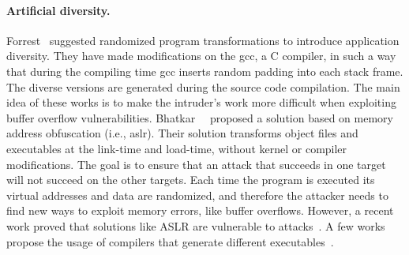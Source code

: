 \paragraph{Artificial diversity.} 
Forrest~\cite{Forrest:1997} suggested randomized program transformations to introduce application diversity. 
They have made modifications on the gcc, a C compiler, in such a way that during the compiling time gcc inserts random padding
into each stack frame. 
The diverse versions are generated during the source code compilation. 
The main idea of these works is to make the intruder’s work more difficult when exploiting buffer overflow vulnerabilities.
Bhatkar~\etal{}~\cite{Bhatkar:2003} proposed a solution based on memory address obfuscation (i.e., \gls{aslr}). 
Their solution transforms object files and executables at the link-time and load-time, without kernel or compiler modifications. 
The goal is to ensure that an attack that succeeds in one target will not succeed on the other targets. 
Each time the program is executed its virtual addresses and data are randomized, and therefore the attacker needs to find new ways to exploit memory errors, like buffer overflows. 
However, a recent work proved that solutions like ASLR are vulnerable to attacks~\cite{Bittau:2014,Jang:2016}.
A few works propose the usage of compilers that generate different executables~\cite{Platania:2014,Roeder:2010,King:2016}.




